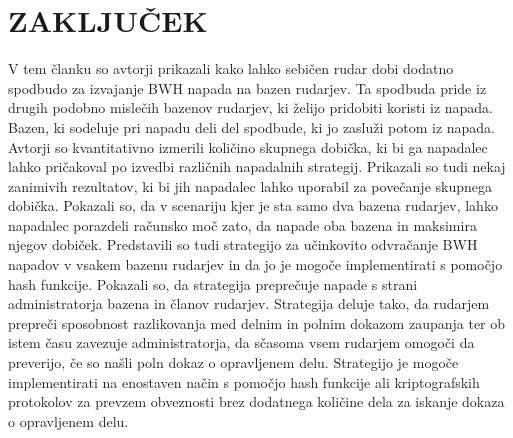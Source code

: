 \documentclass{acm_proc_article-sp}
\begin{document}
\section{ZAKLJUČEK}
V tem članku so avtorji prikazali kako lahko sebičen rudar dobi dodatno spodbudo za izvajanje BWH napada na bazen rudarjev. Ta spodbuda pride iz drugih podobno mislečih bazenov rudarjev, ki želijo pridobiti koristi iz napada. Bazen, ki sodeluje pri napadu deli del spodbude, ki jo zasluži potom iz napada. Avtorji so kvantitativno izmerili količino skupnega dobička, ki bi ga napadalec lahko pričakoval po izvedbi različnih napadalnih strategij. Prikazali so tudi nekaj zanimivih rezultatov, ki bi jih napadalec lahko uporabil za povečanje skupnega dobička. Pokazali so, da v scenariju kjer je sta samo dva bazena rudarjev, lahko napadalec porazdeli računsko moč zato, da napade oba bazena in maksimira njegov dobiček. Predstavili so tudi strategijo za učinkovito odvračanje BWH napadov v vsakem bazenu rudarjev in da jo je mogoče implementirati s pomočjo hash funkcije. Pokazali so, da strategija preprečuje napade s strani administratorja bazena in članov rudarjev. Strategija deluje tako, da rudarjem prepreči sposobnost razlikovanja med delnim in polnim dokazom zaupanja  ter ob istem času zavezuje administratorja, da sčasoma vsem rudarjem omogoči da preverijo, če so našli poln dokaz o opravljenem delu. Strategijo je mogoče implementirati na enostaven način s pomočjo hash funkcije ali kriptografskih protokolov za prevzem obveznosti brez dodatnega količine dela za iskanje dokaza o opravljenem delu.
\end{document}
